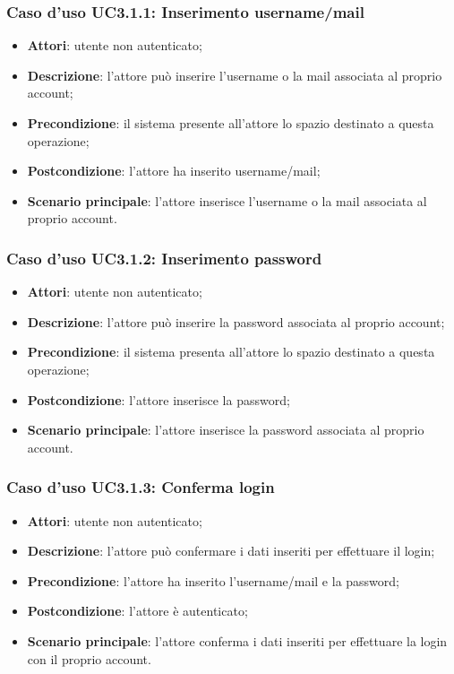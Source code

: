 \subsubsection{Caso d'uso UC3.1.1: Inserimento username/mail}
\begin{itemize}
	\item \textbf{Attori}: utente non autenticato;
	\item \textbf{Descrizione}: l'attore può inserire l'username o la mail associata al proprio account;
	\item \textbf{Precondizione}: il sistema presente all'attore lo spazio destinato a questa operazione;
	\item \textbf{Postcondizione}: l'attore ha inserito username/mail;
	\item \textbf{Scenario principale}: l'attore inserisce l'username o la mail associata al proprio account. 
\end{itemize}

\subsubsection{Caso d'uso UC3.1.2: Inserimento password}
\begin{itemize}
	\item \textbf{Attori}: utente non autenticato;
	\item \textbf{Descrizione}: l'attore può inserire la password associata al proprio account;
	\item \textbf{Precondizione}: il sistema presenta all'attore lo spazio destinato a questa operazione;
	\item \textbf{Postcondizione}: l'attore inserisce la password;
	\item \textbf{Scenario principale}: l'attore inserisce la password associata al proprio account.
\end{itemize}

\subsubsection{Caso d'uso UC3.1.3: Conferma login}
\begin{itemize}
	\item \textbf{Attori}: utente non autenticato;
	\item \textbf{Descrizione}: l'attore può confermare i dati inseriti per effettuare il login;
	\item \textbf{Precondizione}: l'attore ha inserito l'username/mail e la password;
	\item \textbf{Postcondizione}: l'attore è autenticato;
	\item \textbf{Scenario principale}: l'attore conferma i dati inseriti per effettuare la login con il proprio account.
\end{itemize}

